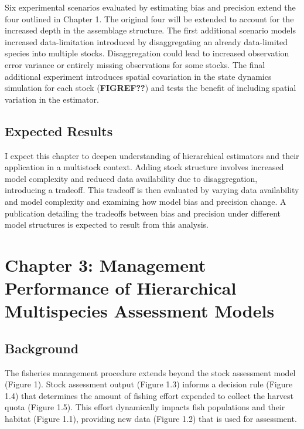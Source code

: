 \documentclass[12pt,]{scrartcl}
\begin{document}
Six experimental scenarios evaluated by estimating bias and precision
extend the four outlined in Chapter 1. The original four will be
extended to account for the increased depth in the assemblage structure.
The first additional scenario models increased data-limitation
introduced by disaggregating an already data-limited species into
multiple stocks. Disaggregation could lead to increased observation
error variance or entirely missing observations for some stocks. The
final additional experiment introduces spatial covariation in the state
dynamics simulation for each stock (\textbf{FIGREF??}) and tests the
benefit of including spatial variation in the estimator.

\subsection{Expected Results}\label{expected-results-1}

I expect this chapter to deepen understanding of hierarchical estimators
and their application in a multistock context. Adding stock structure
involves increased model complexity and reduced data availability due to
disaggregation, introducing a tradeoff. This tradeoff is then evaluated
by varying data availability and model complexity and examining how
model bias and precision change. A publication detailing the tradeoffs
between bias and precision under different model structures is expected
to result from this analysis.

\section{Chapter 3: Management Performance of Hierarchical Multispecies
Assessment
Models}\label{chapter-3-management-performance-of-hierarchical-multispecies-assessment-models}

\subsection{Background}\label{background-3}

The fisheries management procedure extends beyond the stock assessment
model (Figure 1). Stock assessment output (Figure 1.3) informs a
decision rule (Figure 1.4) that determines the amount of fishing effort
expended to collect the harvest quota (Figure 1.5). This effort
dynamically impacts fish populations and their habitat (Figure 1.1),
providing new data (Figure 1.2) that is used for assessment.
\end{document}
